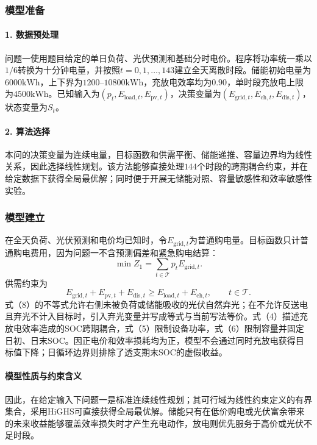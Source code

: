\documentclass{cumcmthesis}
\newcommand{\kwh}{\mathrm{kWh}}
\newcommand{\Tset}{\mathcal{T}}
\begin{document}
\subsubsection{模型准备}

\paragraph{1. 数据预处理}

问题一使用题目给定的单日负荷、光伏预测和基础分时电价。程序将功率统一乘以$1/6$转换为十分钟电量，并按照$t=0,1,\ldots,143$建立全天离散时段。储能初始电量为$6000\kwh$，上下界为$1200$--$10800\kwh$，充放电效率均为$0.90$，单时段充放电上限为$4500\kwh$。已知输入为$(p_t,E_{\mathrm{load},t},E_{\mathrm{pv},t})$，决策变量为$(E_{\mathrm{grid},t},E_{\mathrm{ch},t},E_{\mathrm{dis},t})$，状态变量为$S_t$。

\paragraph{2. 算法选择}

本问的决策变量为连续电量，目标函数和供需平衡、储能递推、容量边界均为线性关系，因此选择线性规划。该方法能够直接处理$144$个时段的跨期耦合约束，并在给定数据下获得全局最优解；同时便于开展无储能对照、容量敏感性和效率敏感性实验。

\subsubsection{模型建立}

在全天负荷、光伏预测和电价均已知时，令$E_{\mathrm{grid},t}$为普通购电量。目标函数只计普通购电费用，因为问题一不含预测偏差和紧急购电结算：
\begin{equation}
\min Z_1=\sum_{t\in\Tset}p_tE_{\mathrm{grid},t}.
\tag{7}
\end{equation}
供需约束为
\begin{equation}
E_{\mathrm{grid},t}+E_{\mathrm{pv},t}+E_{\mathrm{dis},t}
\geq E_{\mathrm{load},t}+E_{\mathrm{ch},t},\qquad t\in\Tset.
\tag{8}
\end{equation}
式（8）的不等式允许右侧未被负荷或储能吸收的光伏自然弃光；在不允许反送电且弃光不计入目标时，引入弃光变量并写成等式与当前写法等价。式（4）描述充放电效率造成的SOC跨期耦合，式（5）限制设备功率，式（6）限制容量并固定日初、日末SOC。因正电价和效率损耗均为正，模型不会通过同时充放电获得目标值下降；日循环边界则排除了透支期末SOC的虚假收益。

\paragraph{模型性质与约束含义}
因此，在给定输入下问题一是标准连续线性规划；其可行域为线性约束定义的有界集合，采用HiGHS可直接获得全局最优解。储能只有在低价购电或光伏富余带来的未来收益能够覆盖效率损失时才产生充电动作，放电则优先服务于高价或光伏不足时段。
\end{document}
